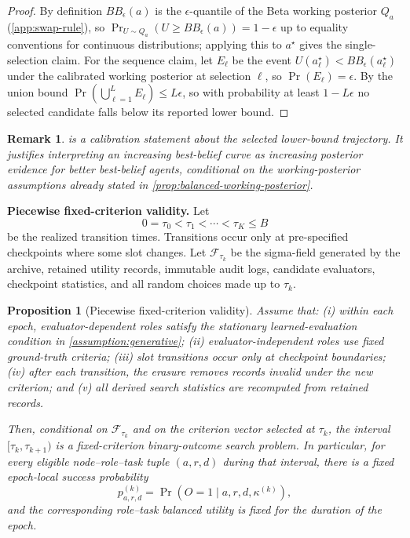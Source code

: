\documentclass{paper}
\newtheorem{proposition}{Proposition}
\newtheorem{remark}{Remark}
\begin{document}
\begin{proof}
By definition \(BB_\epsilon(a)\) is the \(\epsilon\)-quantile of the Beta working posterior \(Q_a\) (\cref{app:swap-rule}), so \(\Pr_{U\sim Q_a}(U\ge BB_\epsilon(a))=1-\epsilon\) up to equality conventions for continuous distributions; applying this to \(a^\star\) gives the single-selection claim. For the sequence claim, let \(E_\ell\) be the event \(U(a^\star_\ell)<BB_\epsilon(a^\star_\ell)\) under the calibrated working posterior at selection \(\ell\), so \(\Pr(E_\ell)=\epsilon\). By the union bound \(\Pr(\bigcup_{\ell=1}^L E_\ell)\le L\epsilon\), so with probability at least \(1-L\epsilon\) no selected candidate falls below its reported lower bound.
\end{proof}

\begin{remark}
 is a calibration statement about the selected lower-bound trajectory. It justifies interpreting an increasing best-belief curve as increasing posterior evidence for better best-belief agents, conditional on the working-posterior assumptions already stated in \cref{prop:balanced-working-posterior}.
\end{remark}

\noindent\textbf{Piecewise fixed-criterion validity.}
Let
\[
0=\tau_0 < \tau_1 < \cdots < \tau_K \le B
\]
be the realized transition times. Transitions occur only at pre-specified checkpoints where some slot changes. Let \(\mathcal{F}_{\tau_k}\) be the sigma-field generated by the archive, retained utility records, immutable audit logs, candidate evaluators, checkpoint statistics, and all random choices made up to \(\tau_k\).

\begin{proposition}[Piecewise fixed-criterion validity]
\label{prop:piecewise-fixed-validity}
Assume that: (i) within each epoch, evaluator-dependent roles satisfy the stationary learned-evaluation condition in \cref{assumption:generative}; (ii) evaluator-independent roles use fixed ground-truth criteria; (iii) slot transitions occur only at checkpoint boundaries; (iv) after each transition, the erasure removes records invalid under the new criterion; and (v) all derived search statistics are recomputed from retained records.

Then, conditional on \(\mathcal{F}_{\tau_k}\) and on the criterion vector selected at \(\tau_k\), the interval \([\tau_k,\tau_{k+1})\) is a fixed-criterion binary-outcome search problem. In particular, for every eligible node--role--task tuple \((a,r,d)\) during that interval, there is a fixed epoch-local success probability
\[
p_{a,r,d}^{(k)} = \Pr(O=1 \mid a,r,d,\kappa^{(k)}),
\]
and the corresponding role--task balanced utility is fixed for the duration of the epoch.
\end{proposition}
\end{document}
